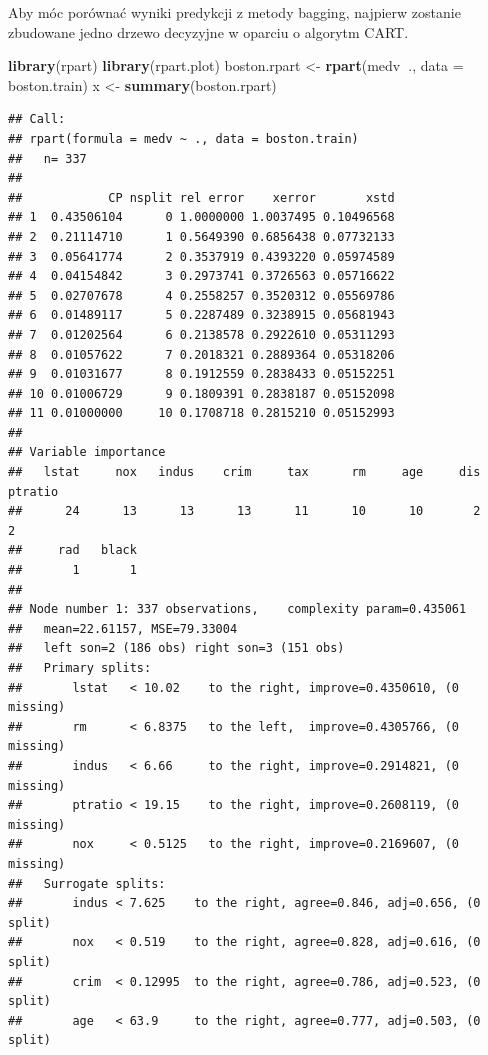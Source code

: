 \documentclass[]{book}
\newenvironment{Shaded}{\begin{snugshade}}{\end{snugshade}}
\newcommand{\DataTypeTok}[1]{\textcolor[rgb]{0.13,0.29,0.53}{#1}}
\newcommand{\KeywordTok}[1]{\textcolor[rgb]{0.13,0.29,0.53}{\textbf{#1}}}
\newcommand{\NormalTok}[1]{#1}
\newcommand{\OperatorTok}[1]{\textcolor[rgb]{0.81,0.36,0.00}{\textbf{#1}}}
\newcommand{\StringTok}[1]{\textcolor[rgb]{0.31,0.60,0.02}{#1}}
\theoremstyle{plain}
\theoremstyle{definition}
\begin{document}
Aby móc porównać wyniki predykcji z metody bagging, najpierw zostanie zbudowane jedno drzewo decyzyjne w oparciu o algorytm CART.

\begin{Shaded}
\begin{Highlighting}[]
\KeywordTok{library}\NormalTok{(rpart)}
\KeywordTok{library}\NormalTok{(rpart.plot)}
\NormalTok{boston.rpart <-}\StringTok{ }\KeywordTok{rpart}\NormalTok{(medv}\OperatorTok{~}\NormalTok{., }\DataTypeTok{data =}\NormalTok{ boston.train)}
\NormalTok{x <-}\StringTok{ }\KeywordTok{summary}\NormalTok{(boston.rpart)}
\end{Highlighting}
\end{Shaded}

\begin{verbatim}
## Call:
## rpart(formula = medv ~ ., data = boston.train)
##   n= 337 
## 
##            CP nsplit rel error    xerror       xstd
## 1  0.43506104      0 1.0000000 1.0037495 0.10496568
## 2  0.21114710      1 0.5649390 0.6856438 0.07732133
## 3  0.05641774      2 0.3537919 0.4393220 0.05974589
## 4  0.04154842      3 0.2973741 0.3726563 0.05716622
## 5  0.02707678      4 0.2558257 0.3520312 0.05569786
## 6  0.01489117      5 0.2287489 0.3238915 0.05681943
## 7  0.01202564      6 0.2138578 0.2922610 0.05311293
## 8  0.01057622      7 0.2018321 0.2889364 0.05318206
## 9  0.01031677      8 0.1912559 0.2838433 0.05152251
## 10 0.01006729      9 0.1809391 0.2838187 0.05152098
## 11 0.01000000     10 0.1708718 0.2815210 0.05152993
## 
## Variable importance
##   lstat     nox   indus    crim     tax      rm     age     dis ptratio 
##      24      13      13      13      11      10      10       2       2 
##     rad   black 
##       1       1 
## 
## Node number 1: 337 observations,    complexity param=0.435061
##   mean=22.61157, MSE=79.33004 
##   left son=2 (186 obs) right son=3 (151 obs)
##   Primary splits:
##       lstat   < 10.02    to the right, improve=0.4350610, (0 missing)
##       rm      < 6.8375   to the left,  improve=0.4305766, (0 missing)
##       indus   < 6.66     to the right, improve=0.2914821, (0 missing)
##       ptratio < 19.15    to the right, improve=0.2608119, (0 missing)
##       nox     < 0.5125   to the right, improve=0.2169607, (0 missing)
##   Surrogate splits:
##       indus < 7.625    to the right, agree=0.846, adj=0.656, (0 split)
##       nox   < 0.519    to the right, agree=0.828, adj=0.616, (0 split)
##       crim  < 0.12995  to the right, agree=0.786, adj=0.523, (0 split)
##       age   < 63.9     to the right, agree=0.777, adj=0.503, (0 split)

\end{verbatim}
\end{document}
